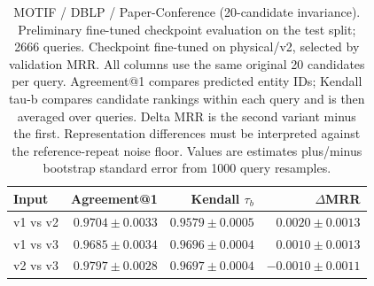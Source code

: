 \begin{table}[t]
\centering
\small
\begin{tabular}{lrrr}
\toprule
Input & Agreement@1 & Kendall $\tau_b$ & $\Delta$MRR \\
\midrule
v1 vs v2 & $0.9704 \pm 0.0033$ & $0.9579 \pm 0.0005$ & $0.0020 \pm 0.0013$ \\
v1 vs v3 & $0.9685 \pm 0.0034$ & $0.9696 \pm 0.0004$ & $0.0010 \pm 0.0013$ \\
v2 vs v3 & $0.9797 \pm 0.0028$ & $0.9697 \pm 0.0004$ & $-0.0010 \pm 0.0011$ \\
\bottomrule
\end{tabular}
\caption{MOTIF / DBLP / Paper-Conference (20-candidate invariance). Preliminary fine-tuned checkpoint evaluation on the test split; 2666 queries. Checkpoint fine-tuned on physical/v2, selected by validation MRR. All columns use the same original 20 candidates per query. Agreement@1 compares predicted entity IDs; Kendall tau-b compares candidate rankings within each query and is then averaged over queries. Delta MRR is the second variant minus the first. Representation differences must be interpreted against the reference-repeat noise floor. Values are estimates plus/minus bootstrap standard error from 1000 query resamples.}
\label{tab:motif-paper_conference-invariance}
\end{table}
